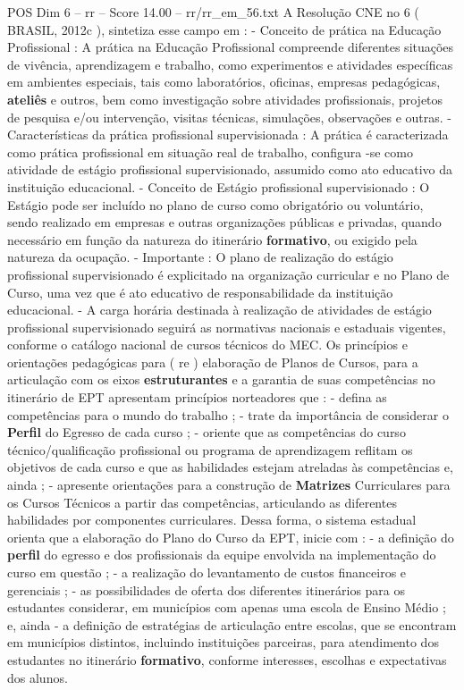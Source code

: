 \begin{textsample}{POS Dim 6 – rr – Score 14.00 – rr/rr\_em\_56.txt}
A Resolução CNE no 6 ( BRASIL, 2012c ), sintetiza esse campo em : - Conceito de prática na Educação Profissional : A prática na Educação Profissional compreende diferentes situações de vivência, aprendizagem e trabalho, como experimentos e atividades específicas em ambientes especiais, tais como laboratórios, oficinas, empresas pedagógicas, \textbf{ateliês} e outros, bem como investigação sobre atividades profissionais, projetos de pesquisa e/ou intervenção, visitas técnicas, simulações, observações e outras. - Características da prática profissional supervisionada : A prática é caracterizada como prática profissional em situação real de trabalho, configura -se como atividade de estágio profissional supervisionado, assumido como ato educativo da instituição educacional. - Conceito de Estágio profissional supervisionado : O Estágio pode ser incluído no plano de curso como obrigatório ou voluntário, sendo realizado em empresas e outras organizações públicas e privadas, quando necessário em função da natureza do itinerário \textbf{formativo}, ou exigido pela natureza da ocupação. - Importante : O plano de realização do estágio profissional supervisionado é explicitado na organização curricular e no Plano de Curso, uma vez que é ato educativo de responsabilidade da instituição educacional. - A carga horária destinada à realização de atividades de estágio profissional supervisionado seguirá as normativas nacionais e estaduais vigentes, conforme o catálogo nacional de cursos técnicos do MEC.
Os princípios e orientações pedagógicas para ( re ) elaboração de Planos de Cursos, para a articulação com os eixos \textbf{estruturantes} e a garantia de suas competências no itinerário de EPT apresentam princípios norteadores que : - defina as competências para o mundo do trabalho ; - trate da importância de considerar o \textbf{Perfil} do Egresso de cada curso ; - oriente que as competências do curso técnico/qualificação profissional ou programa de aprendizagem reflitam os objetivos de cada curso e que as habilidades estejam atreladas às competências e, ainda ; - apresente orientações para a construção de \textbf{Matrizes} Curriculares para os Cursos Técnicos a partir das competências, articulando as diferentes habilidades por componentes curriculares.
Dessa forma, o sistema estadual orienta que a elaboração do Plano do Curso da EPT, inicie com : - a definição do \textbf{perfil} do egresso e dos profissionais da equipe envolvida na implementação do curso em questão ; - a realização do levantamento de custos financeiros e gerenciais ; - as possibilidades de oferta dos diferentes itinerários para os estudantes considerar, em municípios com apenas uma escola de Ensino Médio ; e, ainda - a definição de estratégias de articulação entre escolas, que se encontram em municípios distintos, incluindo instituições parceiras, para atendimento dos estudantes no itinerário \textbf{formativo}, conforme interesses, escolhas e expectativas dos alunos.

\end{textsample}
